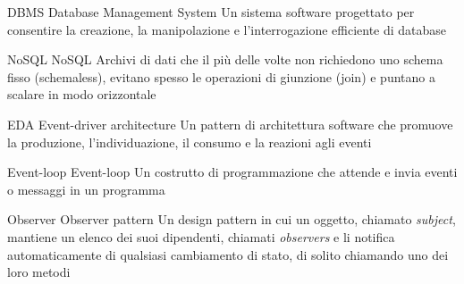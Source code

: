{DBMS}            %
{Database Management System}  %
{Un sistema software progettato per consentire la creazione, la manipolazione e l'interrogazione efficiente di database} %

{NoSQL}            %
{NoSQL}  %
{Archivi di dati che il più delle volte non richiedono uno schema fisso (schemaless), evitano spesso le operazioni di giunzione (join) e puntano a scalare in modo orizzontale} %

{EDA}
{Event-driver architecture}
{Un pattern di architettura software che promuove la produzione, l'individuazione, il consumo e la reazioni agli eventi}

{Event-loop}
{Event-loop}
{Un costrutto di programmazione che attende e invia eventi o messaggi in un programma}


{Observer}
{Observer pattern}
{Un design pattern in cui un oggetto, chiamato \textit{subject}, mantiene un elenco dei suoi dipendenti, chiamati \textit{observers} e li notifica automaticamente di qualsiasi cambiamento di stato, di solito chiamando uno dei loro metodi}